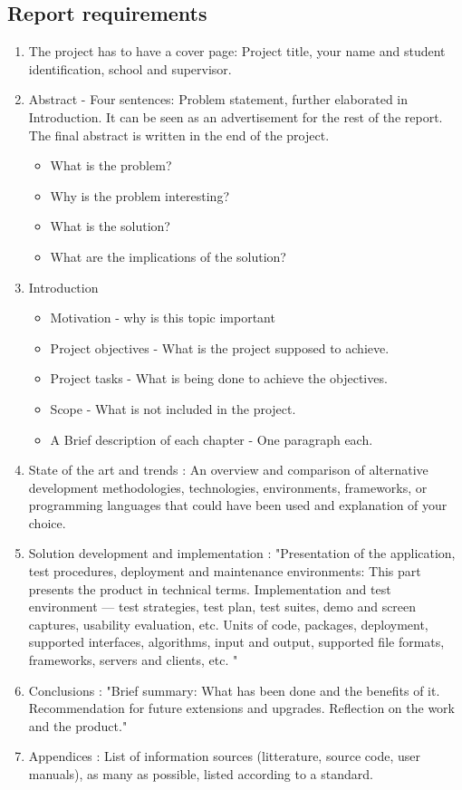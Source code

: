 \documentclass{article}
\begin{document}
\subsection{Report requirements \cite{bachelorProject}}
\begin{enumerate}
    \item The project has to have a cover page: Project title, your name and student identification,
school and supervisor.
    \item Abstract - Four sentences: Problem statement, further elaborated in Introduction. It can be seen as an advertisement for the rest of the report. The final
abstract is written in the end of the project.
    \begin{itemize}
    \item What is the problem? 
    \item Why is the problem interesting? 
    \item What is the solution? 
    \item What are the implications of the solution?

    \end{itemize}
    \item Introduction
    \begin{itemize}
        \item Motivation - why is this topic important
        \item Project objectives - What is the project supposed to achieve.
        \item Project tasks - What is being done to achieve the objectives.
        \item Scope - What is not included in the project.
        \item A Brief description of each chapter - One paragraph each. 
    \end{itemize}
    \item State of the art and trends : An overview and comparison of alternative development methodologies, technologies, environments, frameworks, or programming
languages that could have been used and explanation of your choice.

\item Solution development and implementation : "Presentation of the application, test procedures, deployment and maintenance environments: This part
presents the product in technical terms. Implementation and test environment
— test strategies, test plan, test suites, demo and screen captures, usability
evaluation, etc. Units of code, packages, deployment, supported interfaces, algorithms, input and output, supported file formats, frameworks, servers and
clients, etc.
" \cite{bachelorProject}

\item Conclusions : "Brief summary: What has been done and the benefits of it.
Recommendation for future extensions and upgrades. Reflection on the work
and the product." \cite{bachelorProject}

\item Appendices : List of information sources (litterature, source code, user manuals), as many as possible, listed according to a standard.

\end{enumerate}




\end{document}
